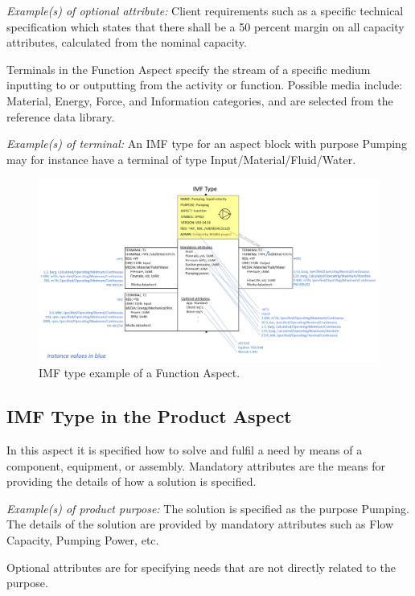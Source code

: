 \documentclass[../main.tex]{subfiles}
\begin{document}
\emph{Example(s) of optional attribute:}
Client requirements such as a specific technical specification which states that there shall be a 50 percent margin on
        all capacity attributes, calculated from the nominal capacity.

Terminals in the Function Aspect specify the stream of a specific medium inputting to or outputting from the activity
or function. Possible media include: Material, Energy, Force, and Information categories, and are selected from the
reference data library.

\emph{Example(s) of terminal:}
An IMF type for an aspect block with purpose Pumping may for instance have a terminal of type
        Input/Material/Fluid/Water.

\begin{figure}[htb]
  \centering
  \includegraphics[width=1\textwidth]{img/IMFmanual-img068.png}

  \caption{IMF type example of a Function Aspect.}
  \label{fig:Figure 50}
\end{figure}

\subsection{IMF Type in the Product Aspect}
In this aspect it is specified how to solve and fulfil a need by means of a component,
equipment, or assembly. Mandatory attributes are the means for providing the details of how a solution is specified.

\emph{Example(s) of product purpose:}
The solution is specified as the purpose Pumping. The details of the solution are provided by mandatory
        attributes such as Flow Capacity, Pumping Power, etc.

Optional attributes are for specifying needs that are not directly related to the purpose.
\end{document}
